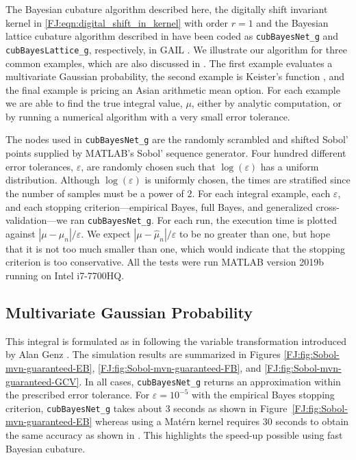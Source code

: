 \documentclass[graybox,footinfo]{svmult}
\newcommand{\abs}[1]{\left\lvert #1 \right\rvert} %
\begin{document}
\label{FJ:sec:NumExp}


The Bayesian cubature algorithm described here, the digitally shift invariant kernel in \eqref{FJ:eqn:digital_shift_in_kernel} with order $r=1$  and the Bayesian lattice cubature algorithm described in \cite{RatHic19a} have been coded as  \texttt{cubBayesNet\_g} and \texttt{cubBayesLattice\_g}, respectively, in GAIL \cite{ChoEtal21a}.  We illustrate our algorithm for three common examples, which are also discussed in \cite{RatHic19a}.  The first example evaluates a multivariate Gaussian probability, the second example is Keister's function \cite{Kei96}, and the final example is pricing an Asian arithmetic mean option.  For each example we are able to find the true integral value, $\mu$, either by analytic computation, or by running a numerical algorithm with a very small error tolerance.

The nodes used in \texttt{cubBayesNet\_g} are the randomly scrambled and shifted Sobol' points supplied by MATLAB's Sobol' sequence generator. Four hundred different error tolerances, $\varepsilon$, are randomly chosen such that $\log(\varepsilon)$ has a uniform distribution.   Although $\log(\varepsilon)$ is uniformly chosen, the times are stratified since the number of samples must be a power of $2$.
For each integral example, each $\varepsilon$, and each stopping criterion---empirical Bayes, full Bayes, and generalized cross-validation---we ran \texttt{cubBayesNet\_g}.  For each run, the execution time is plotted against $\abs{\mu - \widehat{\mu}_n}/\varepsilon$.  We expect $\abs{\mu - \widehat{\mu}_n}/\varepsilon$ to be no greater than one, but hope that it is not too much smaller than one, which would indicate that the stopping criterion  is too conservative.
All the tests were run MATLAB version 2019b running on Intel i7-7700HQ.

\subsection{Multivariate Gaussian Probability}

This integral is formulated as in \cite{RatHic19a} following the variable transformation introduced by Alan Genz \cite{Gen92}. The simulation results are summarized in Figures \ref{FJ:fig:Sobol-mvn-guaranteed-EB}, \ref{FJ:fig:Sobol-mvn-guaranteed-FB}, and \ref{FJ:fig:Sobol-mvn-guaranteed-GCV}.  In all cases, \texttt{cubBayesNet\_g} returns an approximation within the prescribed error tolerance. For  $\varepsilon=10^{-5}$ with the empirical Bayes stopping criterion, \texttt{cubBayesNet\_g} takes about 3 seconds as shown in Figure~\ref{FJ:fig:Sobol-mvn-guaranteed-EB} whereas using a Mat\'ern kernel requires 30 seconds to obtain the same accuracy as shown in \cite{RatHic19a}. This highlights the speed-up possible using fast Bayesian cubature.
\end{document}

